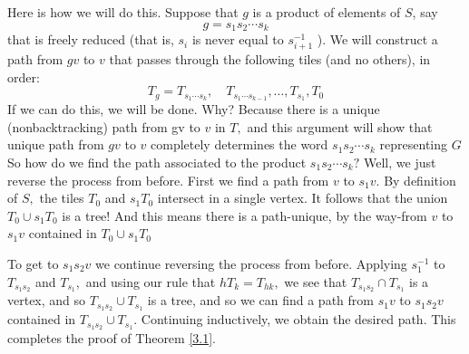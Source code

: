 Here is how we will do this. Suppose that $g$ is a product of elements of $S$, say
\[
g=s_{1} s_{2} \cdots s_{k}
\]
that is freely reduced (that is, $s_{i}$ is never equal to $s_{i+1}^{-1}$ ). We will construct a path from $g v$ to $v$ that passes through the following tiles (and no others), in order:
\[
T_{g}=T_{s_{1} \cdots s_{k}}, \quad T_{s_{1} \cdots s_{k-1}}, \ldots, T_{s_{1}}, T_{0}
\]
If we can do this, we will be done. Why? Because there is a unique (nonbacktracking) path from gv to $v$ in $T,$ and this argument will show that unique path from $g v$ to $v$ completely determines the word $s_{1} s_{2} \cdots s_{k}$ representing $G$ So how do we find the path associated to the product $s_{1} s_{2} \cdots s_{k} ?$ Well, we just reverse the process from before. First we find a path from $v$ to $s_{1} v .$ By definition of $S,$ the tiles $T_{0}$ and $s_{1} T_{0}$ intersect in a single vertex. It follows that the union $T_{0} \cup s_{1} T_{0}$ is a tree! And this means there is a path-unique, by the way-from $v$ to $s_{1} v$ contained in $T_{0} \cup s_{1} T_{0}$
\par
To get to $s_{1} s_{2} v$ we continue reversing the process from before. Applying $s_{1}^{-1}$ to $T_{s_{1} s_{2}}$ and $T_{s_{1}},$ and using our rule that $h T_{k}=T_{h k},$ we see that $T_{s_{1} s_{2}} \cap T_{s_{1}}$ is a vertex, and so $T_{s_{1} s_{2}} \cup T_{s_{1}}$ is a tree, and so we can find a path from $s_{1} v$ to $s_{1} s_{2} v$ contained in $T_{s_{1} s_{2}} \cup T_{s_{1}} .$ Continuing inductively, we obtain the desired path. This completes the proof of Theorem \ref{3.1}.

